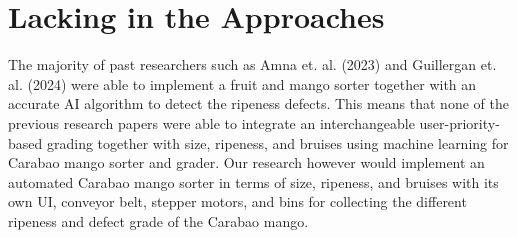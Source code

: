 \section{Lacking in the Approaches}
The majority of past researchers such as Amna et. al. (2023) and Guillergan et. al.
(2024) were able to implement a fruit and mango sorter together with an accurate AI
algorithm to detect the ripeness defects. This means that none of the previous research
papers were able to integrate an interchangeable user-priority-based grading together
with size, ripeness, and bruises using machine learning for Carabao mango sorter and
grader. Our research however would implement an automated Carabao mango sorter in
terms of size, ripeness, and bruises with its own UI, conveyor belt, stepper motors, and
bins for collecting the different ripeness and defect grade of the Carabao mango.

